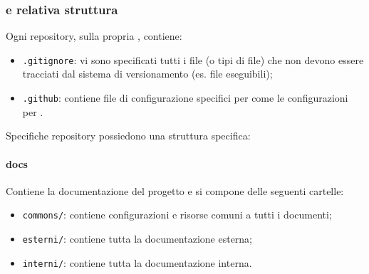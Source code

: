 \documentclass[]{article}
\begin{document}
			\subsubsection{ e relativa struttura}
			Ogni repository, sulla propria , contiene:
			\begin{itemize}
				\item \verb!.gitignore!: vi sono specificati tutti i file (o tipi di file) che non devono essere tracciati dal sistema di versionamento (es. file eseguibili);
				\item \verb!.github!: contiene file di configurazione specifici per  come le configurazioni per .
			\end{itemize}
			Specifiche repository possiedono una struttura specifica:
				\paragraph{docs}
				Contiene la documentazione del progetto e si compone delle seguenti cartelle:
				\begin{itemize}
					\item \verb!commons/!: contiene configurazioni e risorse comuni a tutti i documenti;
					\item \verb!esterni/!: contiene tutta la documentazione esterna;
					\item \verb!interni/!: contiene tutta la documentazione interna.
				\end{itemize}
\end{document}
